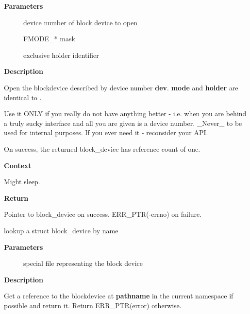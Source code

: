 \documentclass[a4paper,8pt,english]{sphinxmanual}
\begin{document}
\textbf{Parameters}
\begin{description}
\item[{}] \leavevmode
device number of block device to open

\item[{}] \leavevmode
FMODE\_* mask

\item[{}] \leavevmode
exclusive holder identifier

\end{description}

\textbf{Description}

Open the blockdevice described by device number \textbf{dev}.  \textbf{mode} and
\textbf{holder} are identical to {\hyperref[filesystems/index:c.blkdev_get]{\emph{}}}.

Use it ONLY if you really do not have anything better - i.e. when
you are behind a truly sucky interface and all you are given is a
device number.  \_Never\_ to be used for internal purposes.  If you
ever need it - reconsider your API.

On success, the returned block\_device has reference count of one.

\textbf{Context}

Might sleep.

\textbf{Return}

Pointer to block\_device on success, ERR\_PTR(-errno) on failure.

\begin{fulllineitems}
\label{filesystems/index:c.lookup_bdev}
lookup a struct block\_device by name

\end{fulllineitems}


\textbf{Parameters}
\begin{description}
\item[{}] \leavevmode
special file representing the block device

\end{description}

\textbf{Description}

Get a reference to the blockdevice at \textbf{pathname} in the current
namespace if possible and return it.  Return ERR\_PTR(error)
otherwise.
\end{document}
